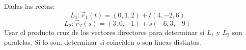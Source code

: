 Dadas las rectas:
\[ L_1: \vec{r}_1(t) = (0, 1, 2) + t(4, -2, 6) \]
\[ L_2: \vec{r}_2(s) = (3, 0, -1) + s(-6, 3, -9) \]
Usar el producto cruz de los vectores directores para determinar si $L_1$ y $L_2$ son paralelas. Si lo son, determinar si coinciden o son líneas distintas.